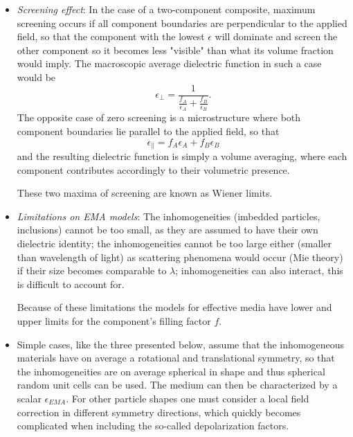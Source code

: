 \begin{itemize}
    \item \emph{Screening effect}: In the case of a two-component composite, maximum screening occurs if all component boundaries are perpendicular to the applied field, so that the component with the lowest $\epsilon$ will dominate and screen the other component so it becomes less "visible" than what its volume fraction would imply. The macroscopic average dielectric function in such a case would be
    \begin{equation}
        \epsilon_\perp = \frac{1}{\frac{f_A}{\epsilon_A} + \frac{f_B}{\epsilon_B}}.
    \end{equation}
    The opposite case of zero screening is a microstructure where both component boundaries lie parallel to the applied field, so that
    \begin{equation}
        \epsilon_\parallel = f_A \epsilon_A + f_B \epsilon_B
    \end{equation}
    and the resulting dielectric function is simply a volume averaging, where each component contributes accordingly to their volumetric presence.
    
    These two maxima of screening are known as Wiener limits.
    
    \item \emph{Limitations on EMA models}: The inhomogeneities (imbedded particles, inclusions) cannot be too small, as they are assumed to have their own dielectric identity; the inhomogeneities cannot be too large either (smaller than wavelength of light) as scattering phenomena would occur (Mie theory) if their size becomes comparable to $\lambda$; inhomogeneities can also interact, this is difficult to account for.
    
    Because of these limitations the models for effective media have lower and upper limits for the component's filling factor $f$.
    
    \item Simple cases, like the three presented below, assume that the inhomogeneous materials have on average a rotational and translational symmetry, so that the inhomogeneities are on average spherical in shape and thus spherical random unit cells can be used. The medium can then be characterized by a scalar $\epsilon_{EMA}$. For other particle shapes one must consider a local field correction in different symmetry directions, which quickly becomes complicated when including the so-called depolarization factors.
    

\end{itemize}
